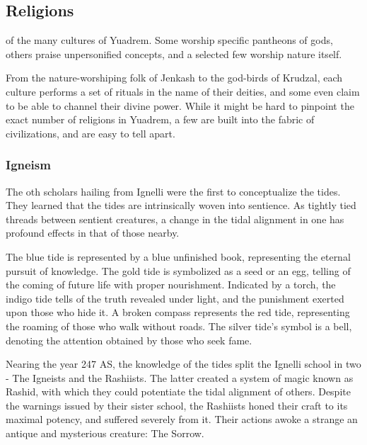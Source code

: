 \subsection*{Religions} \label{ssec::religions}

of the many cultures of Yuadrem.
Some worship specific pantheons of gods, others praise unpersonified concepts, and a selected few worship nature itself.

From the nature-worshiping folk of Jenkash to the god-birds of Krudzal, each culture performs a set of rituals in the name of their deities, and some even claim to be able to channel their divine power.
While it might be hard to pinpoint the exact number of religions in Yuadrem, a few are built into the fabric of civilizations, and are easy to tell apart.

\subsubsection{Igneism}
The oth scholars hailing from Ignelli were the first to conceptualize the tides.
They learned that the tides are intrinsically woven into sentience.
As tightly tied threads between sentient creatures, a change in the tidal alignment in one has profound effects in that of those nearby.

The blue tide is represented by a blue unfinished book, representing the eternal pursuit of knowledge.
The gold tide is symbolized as a seed or an egg, telling of the coming of future life with proper nourishment.
Indicated by a torch, the indigo tide tells of the truth revealed under light, and the punishment exerted upon those who hide it.
A broken compass represents the red tide, representing the roaming of those who walk without roads.
The silver tide's symbol is a bell, denoting the attention obtained by those who seek fame.

Nearing the year 247 AS, the knowledge of the tides split the Ignelli school in two - The Igneists and the Rashiists.
The latter created a system of magic known as Rashid, with which they could potentiate the tidal alignment of others.
Despite the warnings issued by their sister school, the Rashiists honed their craft to its maximal potency, and suffered severely from it.
Their actions awoke a strange an antique and mysterious creature: The Sorrow.

